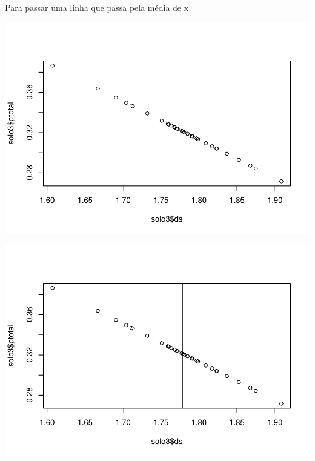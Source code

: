 \documentclass[
]{book}
\newenvironment{Shaded}{\begin{snugshade}}{\end{snugshade}}
\newcommand{\CommentTok}[1]{\textcolor[rgb]{0.56,0.35,0.01}{\textit{#1}}}
\newcommand{\DataTypeTok}[1]{\textcolor[rgb]{0.13,0.29,0.53}{#1}}
\newcommand{\KeywordTok}[1]{\textcolor[rgb]{0.13,0.29,0.53}{\textbf{#1}}}
\newcommand{\NormalTok}[1]{#1}
\newcommand{\OperatorTok}[1]{\textcolor[rgb]{0.81,0.36,0.00}{\textbf{#1}}}
\begin{document}
Para passar uma linha que passa pela média de x

\begin{Shaded}
\end{Shaded}

\includegraphics{TudodoR_files/figure-latex/unnamed-chunk-161-1.pdf}

\begin{Shaded}
\end{Shaded}

\includegraphics{TudodoR_files/figure-latex/unnamed-chunk-162-1.pdf}
\end{document}
